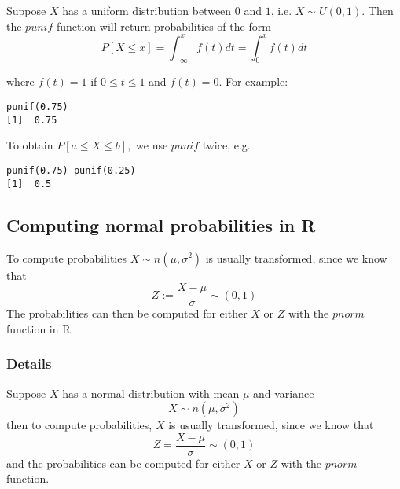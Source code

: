 \documentclass[12pt,a4paper]{article}
\theoremstyle{regla}
\theoremstyle{remark}
\theoremstyle{definition}
\theoremstyle{nonumberbreak}
\begin{document}
\begin{xmpl}

Suppose $X$ has a uniform distribution between $0$ and $1$, i.e. $X \sim U(0,1)$.  Then the $punif$ function will return probabilities of the form $$ P[X \leq x]= \int_{-\infty}^{x} f(t)dt= \int_{0}^{x} f(t)dt$$

where $f(t)=1$ if $0 \leq t \leq 1$
and $f(t)=0$.
For example:
\begin{lstlisting}
punif(0.75)
[1]  0.75
\end{lstlisting}

To obtain $P[a \leq X \leq b],$ we use $punif$ twice, e.g.
\begin{lstlisting}
punif(0.75)-punif(0.25)
[1]  0.5
\end{lstlisting}
\end{xmpl}


\subsection{Computing normal probabilities in R}
\begin{fbox}
\begin{minipage}{0.97\textwidth}
To compute probabilities $X\sim n(\mu,\sigma^2)$
is usually transformed, since we know that
$$
Z:=\frac{X-\mu}{\sigma} \sim(0,1)
$$
The probabilities can then be computed for either $X$ or $Z$ with the $pnorm$ function in R.\\
\end{minipage}
\end{fbox}
\subsubsection{Details}
Suppose $X$ has a normal distribution with mean $\mu$ and variance 
$$
X\sim n(\mu,\sigma^2)
$$
then to compute probabilities, $X$ is usually transformed, since we know that
$$
Z=\frac{X-\mu}{\sigma} \sim(0,1)
$$
and the probabilities can be computed for either $X$ or $Z$ with the $pnorm$ function.
\end{document}

